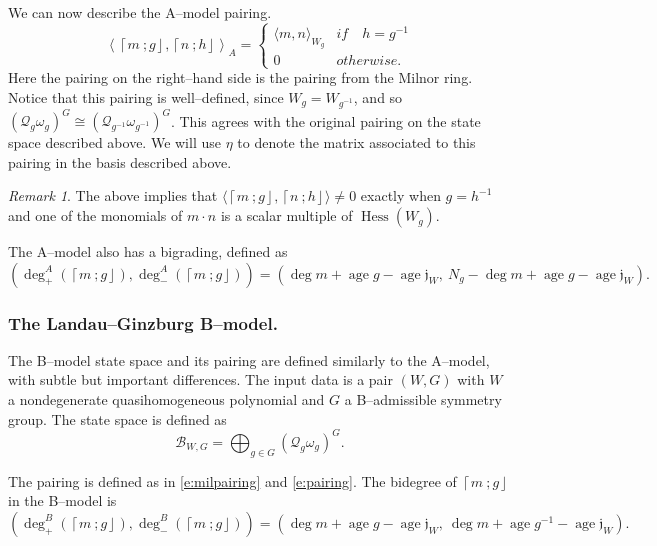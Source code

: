 \documentclass[10pt, letterpaper]{amsart}
\theoremstyle{remark}
\newtheorem{rem}{Remark}[thm]
\newcommand{\sB}{\mathscr{B}}
\newcommand{\sQ}{\mathscr{Q}}
\newcommand{\fjrw}[2]{ \left\lceil #1 \:; #2 \right\rfloor }
\newcommand{\jw}{\mathfrak{j}}
\DeclareMathOperator{\Hess}{Hess}
\DeclareMathOperator{\age}{age}
\begin{document}
We can now describe the A--model pairing. 
\begin{equation}\label{e:pairing}
\left\langle\fjrw{m}{g},\fjrw{n}{h} \right\rangle_A = \left\{ \begin{array}{cc}
							\langle m,n\rangle_{W_g} & if \quad h = g^{-1}\\
							0		& otherwise.
							\end{array}\right.
\end{equation}
Here the pairing on the right--hand side is the pairing from the Milnor ring. Notice that this pairing is well--defined, since $W_g = W_{g^{-1}}$, and so $(\sQ_{g}\omega_g)^{G} \cong (\sQ_{g^{-1}}\omega_{g^{-1}})^{G}$. This agrees with the original pairing on the state space described above.   
We will  use $\eta$ to denote the matrix associated to this pairing in the basis described above. 



\begin{rem}\label{pairing:conditions}
The above implies that  $\langle\fjrw{m}{g},\fjrw{n}{h} \rangle \neq 0$ exactly when $g = h^{-1}$ and one of the monomials of $m\cdot n$ is a scalar multiple of $\Hess(W_g)$.  
\end{rem}


The A--model also has a bigrading, defined as
\begin{equation}\label{e:fjrwbidegree}
(\deg^A_+(\fjrw{m}{g}), \deg^A_-(\fjrw{m}{g})) = \left(\deg m+\age g-\age\jw_W,\ N_g-\deg m+\age g-\age\jw_W\right).
\end{equation}

\subsubsection*{The Landau--Ginzburg B--model.}
The B--model state space and its pairing are defined similarly to the A--model, with subtle but important differences. 
The input data is a pair $(W, G)$ with $W$ a nondegenerate quasihomogeneous polynomial and $G$ a B--admissible symmetry group. The state space is defined as 
\begin{equation*}\label{e:Bstatespace}
\sB_{W,G} = \bigoplus_{g \in G} \left(\sQ_g \omega_g \right)^G.
\end{equation*}

The pairing is defined as in \eqref{e:milpairing} and \eqref{e:pairing}. The bidegree of $\fjrw{m}{g}$ in the B--model is 
\[
(\deg^B_+(\fjrw{m}{g}), \deg^B_-(\fjrw{m}{g})) = \left(\deg m+\age g-\age\jw_W,\ \deg m+\age g^{-1}-\age\jw_W\right).
\] 
\end{document}
